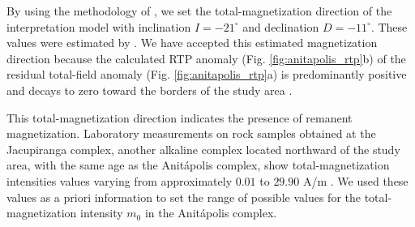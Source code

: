 By using the methodology of \cite{reis-etal2020}, we set the total-magnetization direction of the interpretation model with inclination $ I=-21^\circ $ and declination $ D=-11^\circ $. These values were estimated by \cite{reis-seg-2019}. 
We have accepted this estimated magnetization direction because the calculated RTP anomaly 
(Fig. \ref{fig:anitapolis_rtp}b) of the residual total-field anomaly 
(Fig. \ref{fig:anitapolis_rtp}a) is predominantly positive and decays to zero toward
the borders of the study area \citep{reis-etal2020, reis-seg-2019}.

This total-magnetization direction indicates the presence of remanent magnetization.
Laboratory measurements on rock samples obtained at the Jacupiranga complex,
another alkaline complex located northward of the study area, 
with the same age as the Anit{\'a}polis complex, 
show total-magnetization intensities values varying from approximately 
$0.01$ to $29.90$ A/m \citep[][ tb. 1]{valdivia-2009}.
We used these values as a priori information to set the range of possible values 
for the total-magnetization intensity $m_{0}$ in the Anit{\'a}polis complex.

